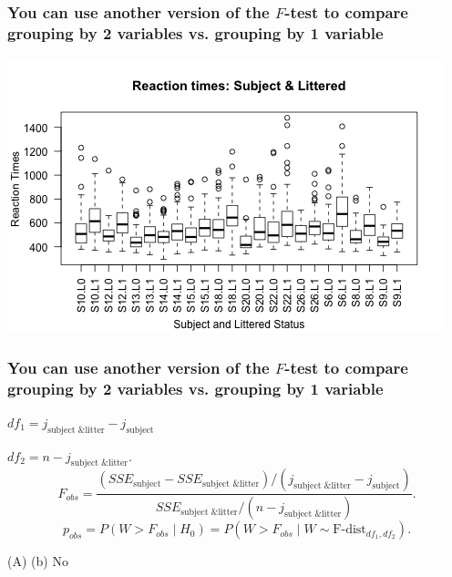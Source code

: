 \documentclass[slidestop,compress,mathserif,12pt,t,professionalfonts,xcolor=table]{beamer}
\newcommand{\solnMult}[1]{
\only<1>{#1}
\only<2->{\red{\textbf{#1}}}
}
\newcommand{\ftest}{You can use another version of the $F$-test to compare grouping by 2 variables vs. grouping by 1 variable}
\begin{document}
\begin{frame}
  \frametitle{\ftest}

\includegraphics[scale=0.7]{figures/rxntime-boxplot-subject-littered.png}

\end{frame}


\begin{frame}
  \frametitle{\ftest}

$df_1 = j_{\text{subject \& litter}} - j_{\text{subject}}$

$df_2 = n - j_{\text{subject \& litter}}$.
\[
F_{obs} = \frac{(SSE_{\text{subject}} - SSE_{\text{subject \& litter}}) / (j_{\text{subject \& litter}} - j_{\text{subject}})}
{SSE_{\text{subject \& litter}} / (n-j_{\text{subject \& litter}})}.
\]
\[
p_{obs} = P(W > F_{obs} \mid H_0) = P(W > F_{obs} \mid W \sim \text{F-dist}_{df_1,df_2}).
\]


(A) \solnMult{Yes} (b) No




\end{frame}

\end{document}
